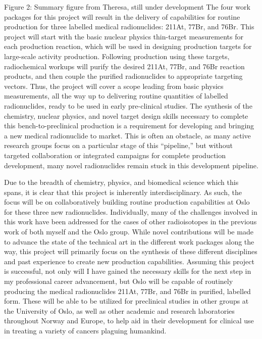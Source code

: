 Figure 2: Summary figure from Theresa, still under development
The four work packages for this project will result in the delivery of capabilities for routine production for three labelled medical radionuclides: 211At, 77Br, and 76Br. This project will start with the basic nuclear physics thin-target measurements for each production reaction, which will be used in designing production targets for large-scale activity production. Following production using these targets, radiochemical workups will purify the desired 211At, 77Br, and 76Br reaction products, and then couple the purified radionuclides to appropriate targeting vectors. Thus, the project will cover a scope leading from basic physics measurements, all the way up to delivering routine quantities of labelled radionuclides, ready to be used in early pre-clinical studies. The synthesis of the chemistry, nuclear physics, and novel target design skills necessary to complete this bench-to-preclinical production is a requirement for developing and bringing a new medical radionuclide to market. This is often an obstacle, as many active research groups focus on a particular stage of this “pipeline,” but without targeted collaboration or integrated campaigns for complete production development, many novel radionuclides remain stuck in this development pipeline.

Due to the breadth of chemistry, physics, and biomedical science which this spans, it is clear that this project is inherently interdisciplinary. As such, the focus will be on collaboratively building routine production capabilities at Oslo for these three new radionuclides. Individually, many of the challenges involved in this work have been addressed for the cases of other radioisotopes in the previous work of both myself and the Oslo group. While novel contributions will be made to advance the state of the technical art in the different work packages along the way, this project will primarily focus on the synthesis of these different disciplines and past experience to create new production capabilities.  Assuming this project is successful, not only will I have gained the necessary skills for the next step in my professional career advancement, but Oslo will be capable of routinely producing the medical radionuclides 211At, 77Br, and 76Br in purified, labelled form. These will be able to be utilized for preclinical studies in other groups at the University of Oslo, as well as other academic and research laboratories throughout Norway and Europe, to help aid in their development for clinical use in treating a variety of cancers plaguing humankind. 





